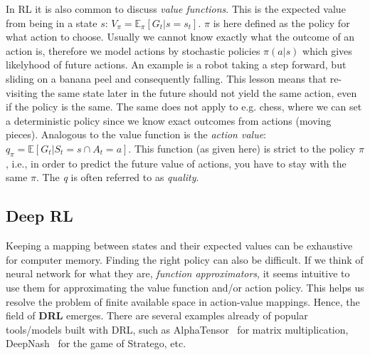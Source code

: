 \documentclass[10pt,twocolumn,letterpaper]{article}
\begin{document}
In \gls{RL} it is also common to discuss \textit{value functions}. This is the expected value from being in a state $s$: $V_{\pi} = \mathbb{E}_{\pi} [ G_{t} | s = s_{t}]$. $\pi$ is here defined as the policy for what action to choose. Usually we cannot know exactly what the outcome of an action is, therefore we model actions by stochastic policies $\pi{}(a | s)$ which gives likelyhood of future actions. An example is a robot taking a step forward, but sliding on a banana peel and consequently falling. This lesson means that re-visiting the same state later in the future should not yield the same action, even if the policy is the same. The same does not apply to e.g. chess, where we can set a deterministic policy since we know exact outcomes from actions (moving pieces). 
Analogous to the value function is the \textit{action value}: $q_{\pi{}} = \mathbb{E} [ G_{t} \vert{} S_{t} = s \cap A_{t} = a]$. This function (as given here) is strict to the policy $\pi$, i.e., in order to predict the future value of actions, you have to stay with the same $\pi$. The \textit{q} is often referred to as \textit{quality}. 



\subsection{Deep RL}
Keeping a mapping between states and their expected values can be exhaustive for computer memory. Finding the right policy can also be difficult. If we think of neural network for what they are, \textit{function approximators}, it seems intuitive to use them for approximating the value function and/or action policy. This helps us resolve the problem of finite available space in action-value mappings. Hence, the field of \textbf{\gls{DRL}} emerges. There are several examples already of popular tools/models built with \gls{DRL}, such as AlphaTensor~\cite{alphaTensor} for matrix multiplication, DeepNash~\cite{stratego} for the game of Stratego, etc. 
\end{document}
